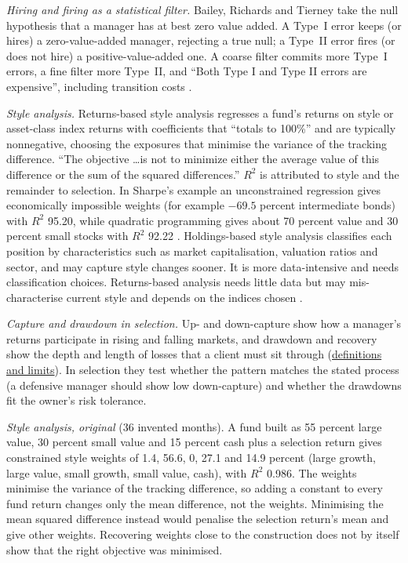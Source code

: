 \begin{qfmethod}
\emph{Hiring and firing as a statistical filter.} Bailey, Richards and Tierney take the null hypothesis that a manager has at best zero value added. A Type~I error keeps (or hires) a zero-value-added manager, rejecting a true null; a Type~II error fires (or does not hire) a positive-value-added one. A coarse filter commits more Type~I errors, a fine filter more Type~II, and ``Both Type I and Type II errors are expensive'', including transition costs \citep[chap.~12, pp.~778--781]{managing-investment-portfolios-2007}.

\emph{Style analysis.} Returns-based style analysis regresses a fund's returns on style or asset-class index returns with coefficients that ``totals to 100\%'' and are typically nonnegative, choosing the exposures that minimise the variance of the tracking difference. ``The objective \ldots is not to minimize either the average value of this difference or the sum of the squared differences.'' $R^2$ is attributed to style and the remainder to selection. In Sharpe's example an unconstrained regression gives economically impossible weights (for example $-69.5$ percent intermediate bonds) with $R^2$ 95.20, while quadratic programming gives about 70 percent value and 30 percent small stocks with $R^2$ 92.22 \citep[sections ``Style Analysis'' and ``Mutual Fund Styles'', Table~2]{wide-sharpe-style}. Holdings-based style analysis classifies each position by characteristics such as market capitalisation, valuation ratios and sector, and may capture style changes sooner. It is more data-intensive and needs classification choices. Returns-based analysis needs little data but may mis-characterise current style and depends on the indices chosen \citep[chap.~7, pp.~436 and~442--444, Exhibit~7-15]{managing-investment-portfolios-2007}.

 \emph{Capture and drawdown in selection.} Up- and down-capture show how a manager's returns participate in rising and falling markets, and drawdown and recovery show the depth and length of losses that a client must sit through (\hyperref[meth:downside-appraisal-measures]{definitions and limits}). In selection they test whether the pattern matches the stated process (a defensive manager should show low down-capture) and whether the drawdowns fit the owner's risk tolerance.

\emph{Style analysis, original} (36 invented months). A fund built as 55 percent large value, 30 percent small value and 15 percent cash plus a selection return gives constrained style weights of 1.4, 56.6, 0, 27.1 and 14.9 percent (large growth, large value, small growth, small value, cash), with $R^2$ 0.986. The weights minimise the variance of the tracking difference, so adding a constant to every fund return changes only the mean difference, not the weights. Minimising the mean squared difference instead would penalise the selection return's mean and give other weights. Recovering weights close to the construction does not by itself show that the right objective was minimised.


\end{qfmethod}
